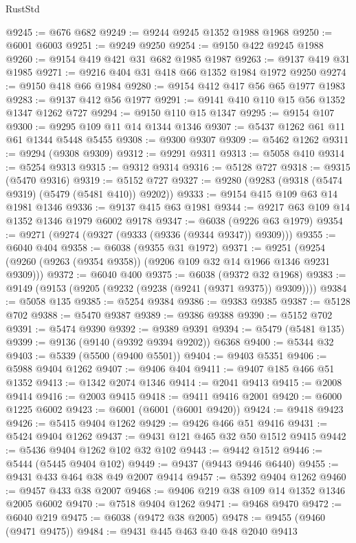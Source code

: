 \begin{lexlean}{RustStd}
\begin{coremodule}
@9245 := @676 @682
@9249 := @9244 @9245 @1352 @1988 @1968
@9250 := @6001 @6003
@9251 := @9249 @9250
@9254 := @9150 @422 @9245 @1988
@9260 := @9154 @419 @421 @31 @682 @1985 @1987
@9263 := @9137 @419 @31 @1985
@9271 := @9216 @404 @31 @418 @66 @1352 @1984 @1972 @9250
@9274 := @9150 @418 @66 @1984
@9280 := @9154 @412 @417 @56 @65 @1977 @1983
@9283 := @9137 @412 @56 @1977
@9291 := @9141 @410 @110 @15 @56 @1352 @1347 @1262 @727
@9294 := @9150 @110 @15 @1347
@9295 := @9154 @107
@9300 := @9295 @109 @11 @14 @1344 @1346
@9307 := @5437 @1262 @61 @11 @61 @1344 @5448 @5455
@9308 := @9300 @9307
@9309 := @5462 @1262
@9311 := @9294 (@9308 @9309)
@9312 := @9291 @9311
@9313 := @5058 @410
@9314 := @5254 @9313
@9315 := @9312 @9314
@9316 := @5128 @727
@9318 := @9315 (@5470 @9316)
@9319 := @5152 @727
@9327 := @9280 (@9283 (@9318 (@5474 @9319) (@5479 (@5481 @410)) @9202))
@9333 := @9154 @415 @109 @63 @14 @1981 @1346
@9336 := @9137 @415 @63 @1981
@9344 := @9217 @63 @109 @14 @1352 @1346 @1979 @6002 @9178
@9347 := @6038 (@9226 @63 @1979)
@9354 := @9271 (@9274 (@9327 (@9333 (@9336 (@9344 @9347)) @9309)))
@9355 := @6040 @404
@9358 := @6038 (@9355 @31 @1972)
@9371 := @9251 (@9254 (@9260 (@9263 (@9354 @9358)) (@9206 @109 @32 @14 @1966 @1346 @9231 @9309)))
@9372 := @6040 @400
@9375 := @6038 (@9372 @32 @1968)
@9383 := @9149 (@9153 (@9205 (@9232 (@9238 (@9241 (@9371 @9375)) @9309))))
@9384 := @5058 @135
@9385 := @5254 @9384
@9386 := @9383 @9385
@9387 := @5128 @702
@9388 := @5470 @9387
@9389 := @9386 @9388
@9390 := @5152 @702
@9391 := @5474 @9390
@9392 := @9389 @9391
@9394 := @5479 (@5481 @135)
@9399 := @9136 (@9140 (@9392 @9394 @9202)) @6368
@9400 := @5344 @32
@9403 := @5339 (@5500 (@9400 @5501))
@9404 := @9403 @5351
@9406 := @5988 @9404 @1262
@9407 := @9406 @404
@9411 := @9407 @185 @466 @51 @1352
@9413 := @1342 @2074 @1346
@9414 := @2041 @9413
@9415 := @2008 @9414
@9416 := @2003 @9415
@9418 := @9411 @9416 @2001
@9420 := @6000 @1225 @6002
@9423 := @6001 (@6001 (@6001 @9420))
@9424 := @9418 @9423
@9426 := @5415 @9404 @1262
@9429 := @9426 @466 @51 @9416
@9431 := @5424 @9404 @1262
@9437 := @9431 @121 @465 @32 @50 @1512 @9415
@9442 := @5436 @9404 @1262 @102 @32 @102
@9443 := @9442 @1512
@9446 := @5444 (@5445 @9404 @102)
@9449 := @9437 (@9443 @9446 @6440)
@9455 := @9431 @433 @464 @38 @49 @2007 @9414
@9457 := @5392 @9404 @1262
@9460 := @9457 @433 @38 @2007
@9468 := @9406 @219 @38 @109 @14 @1352 @1346 @2005 @6002
@9470 := @7518 @9404 @1262
@9471 := @9468 @9470
@9472 := @6040 @219
@9475 := @6038 (@9472 @38 @2005)
@9478 := @9455 (@9460 (@9471 @9475))
@9484 := @9431 @445 @463 @40 @48 @2040 @9413

\end{coremodule}
\end{lexlean}
